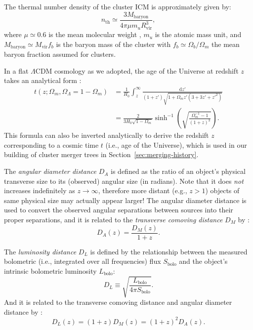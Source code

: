 \documentclass[modern]{aastex61}
\newcommand{\R}[1]{\mathrm{#1}}
\newcommand{\D}[1]{\R{d} #1}
\newcommand{\lcdm}{$\Lambda$CDM}
\begin{document}
The thermal number density of the cluster ICM is approximately given by:
\begin{equation}
  \label{eq:nth}
  n_{\R{th}} \simeq
    \frac{3 M_{\R{baryon}}}{4\pi \mu m_u R_{\R{vir}}^3},
\end{equation}
where $\mu \simeq 0.6$ is the mean molecular weight \citep{ettori2013},
$m_u$ is the atomic mass unit,
and $M_{\R{baryon}} \simeq M_{\R{vir}} f_b$ is the baryon mass
of the cluster with $f_b \simeq \Omega_b / \Omega_m$ the mean baryon
fraction assumed for clusters.

In a flat \lcdm{} cosmology as we adopted, the age of the Universe
at redshift $z$ takes an analytical form
\citep[their Equation~(18)]{thomas2000}:
\begin{align}
  \label{eq:universe-age}
  t(z; \Omega_m, \Omega_{\Lambda}=1-\Omega_m)
    & = \frac{1}{H_0} \int_z^{\infty}
      \frac{\D{z'}}{(1+z')\sqrt{1 + \Omega_m z' (3+3z'+z'^2)}} \nonumber \\
    & = \frac{2}{3 H_0 \sqrt{1-\Omega_m}} \sinh^{-1} \!\left(
      \sqrt{\frac{\Omega_m^{-1} - 1}{(1+z)^3}} \right).
\end{align}
This formula can also be inverted analytically to derive the redshift
$z$ corresponding to a cosmic time $t$ (i.e., age of the Universe),
which is used in our building of cluster merger trees
in Section~\ref{sec:merging-history}.

The \emph{angular diameter distance} $D_A$ is defined as the ratio of
an object's physical transverse size to its (observed) angular size
(in radians).  Note that it does \emph{not} increases indefinitely
as $z \to \infty$, therefore more distant (e.g., $z > 1$)
objects of same physical size may actually appear larger!
The angular diameter distance is used to convert the observed angular
separations between sources into their proper separations, and it is
related to the \emph{transverse comoving distance} $D_M$ by
\citep{weinberg1972,peebles1993,hogg1999}:
\begin{equation}
  \label{eq:da-dm}
  D_A(z) = \frac{D_M(z)}{1 + z}.
\end{equation}

The \emph{luminosity distance} $D_L$ is defined by the relationship
between the measured bolometric (i.e., integrated over all frequencies)
flux $S_{\R{bolo}}$ and the object's intrinsic bolometric luminosity
$L_{\R{bolo}}$:
\begin{equation}
  \label{eq:dl-def}
  D_L \equiv \sqrt{\frac{L_{\R{bolo}}}{4\pi S_{\R{bolo}}}}.
\end{equation}
And it is related to the transverse comoving distance and angular
diameter distance by \citep{weinberg1972,hogg1999,ellis2007}:
\begin{equation}
  \label{eq:dl-dm-da}
  D_L(z) = (1+z) D_M(z) = (1+z)^2 D_A(z).
\end{equation}
\end{document}
